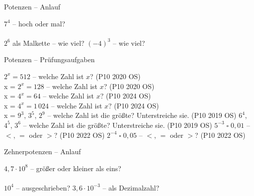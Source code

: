 \setcounter{aufgabe}{44}

\begin{aufgabe}{Potenzen – Anlauf}
\begin{teile}
\teil $7^4$ – hoch oder mal?\\  \\ 
\teil $2^6$ als Malkette – wie viel? \leerfeld
\teil $(-4)^3$ – wie viel? \leerfeld
\end{teile}
\end{aufgabe}

\begin{aufgabe}{Potenzen – Prüfungsaufgaben}
\begin{teile}
\teil $2^x = 512$ – welche Zahl ist $x$? \hfill (P10 2020 OS) \\ x = \leerfeld
\teil $2^x = 128$ – welche Zahl ist $x$? \hfill (P10 2020 OS) \\ x = \leerfeld
\teil $4^x = 64$ – welche Zahl ist $x$? \hfill (P10 2024 OS) \\ x = \leerfeld
\teil $4^x = 1\,024$ – welche Zahl ist $x$? \hfill (P10 2024 OS) \\ x = \leerfeld
\teil $9^3$, $3^5$, $2^9$ – welche Zahl ist die größte? Unterstreiche sie. \hfill (P10 2019 OS)
\teil $6^4$, $4^5$, $3^6$ – welche Zahl ist die größte? Unterstreiche sie. \hfill (P10 2019 OS)
\teil $5^{-3} \;\square\; 0{,}01$ – $<$, $=$ oder $>$? \hfill (P10 2022 OS)
\teil $2^{-4} \;\square\; 0{,}05$ – $<$, $=$ oder $>$? \hfill (P10 2022 OS)
\end{teile}
\end{aufgabe}

\begin{aufgabe}{Zehnerpotenzen – Anlauf}
\begin{teile}
\teil $4{,}7 \cdot 10^{8}$ – größer oder kleiner als eins?\\  \\ 
\teil $10^{4}$ – ausgeschrieben? \leerfeld
\teil $3{,}6 \cdot 10^{-3}$ – als Dezimalzahl? \leerfeld
\end{teile}
\end{aufgabe}

